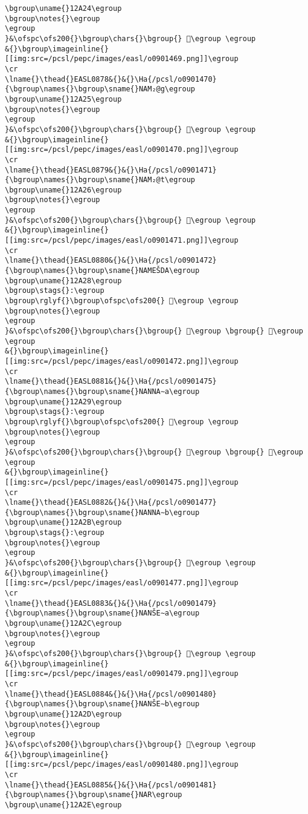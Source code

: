 \begin{verbatim}
\bgroup\uname{}12A24\egroup
\bgroup\notes{}\egroup
\egroup
}&\ofspc\ofs200{}\bgroup\chars{}\bgroup{} 𒨤\egroup \egroup
&{}\bgroup\imageinline{}[[img:src=/pcsl/pepc/images/easl/o0901469.png]]\egroup
\cr
\lname{}\thead{}EASL0878&{}&{}\Ha{/pcsl/o0901470}{\bgroup\names{}\bgroup\sname{}NAM₂@g\egroup
\bgroup\uname{}12A25\egroup
\bgroup\notes{}\egroup
\egroup
}&\ofspc\ofs200{}\bgroup\chars{}\bgroup{} 𒨥\egroup \egroup
&{}\bgroup\imageinline{}[[img:src=/pcsl/pepc/images/easl/o0901470.png]]\egroup
\cr
\lname{}\thead{}EASL0879&{}&{}\Ha{/pcsl/o0901471}{\bgroup\names{}\bgroup\sname{}NAM₂@t\egroup
\bgroup\uname{}12A26\egroup
\bgroup\notes{}\egroup
\egroup
}&\ofspc\ofs200{}\bgroup\chars{}\bgroup{} 𒨦\egroup \egroup
&{}\bgroup\imageinline{}[[img:src=/pcsl/pepc/images/easl/o0901471.png]]\egroup
\cr
\lname{}\thead{}EASL0880&{}&{}\Ha{/pcsl/o0901472}{\bgroup\names{}\bgroup\sname{}NAMEŠDA\egroup
\bgroup\uname{}12A28\egroup
\bgroup\stags{}:\egroup
\bgroup\rglyf{}\bgroup\ofspc\ofs200{} 𒨨\egroup \egroup
\bgroup\notes{}\egroup
\egroup
}&\ofspc\ofs200{}\bgroup\chars{}\bgroup{} 𒨧\egroup \bgroup{} 𒨨\egroup \egroup
&{}\bgroup\imageinline{}[[img:src=/pcsl/pepc/images/easl/o0901472.png]]\egroup
\cr
\lname{}\thead{}EASL0881&{}&{}\Ha{/pcsl/o0901475}{\bgroup\names{}\bgroup\sname{}NANNA∼a\egroup
\bgroup\uname{}12A29\egroup
\bgroup\stags{}:\egroup
\bgroup\rglyf{}\bgroup\ofspc\ofs200{} 𒨩\egroup \egroup
\bgroup\notes{}\egroup
\egroup
}&\ofspc\ofs200{}\bgroup\chars{}\bgroup{} 𒨩\egroup \bgroup{} 𒨪\egroup \egroup
&{}\bgroup\imageinline{}[[img:src=/pcsl/pepc/images/easl/o0901475.png]]\egroup
\cr
\lname{}\thead{}EASL0882&{}&{}\Ha{/pcsl/o0901477}{\bgroup\names{}\bgroup\sname{}NANNA∼b\egroup
\bgroup\uname{}12A2B\egroup
\bgroup\stags{}:\egroup
\bgroup\notes{}\egroup
\egroup
}&\ofspc\ofs200{}\bgroup\chars{}\bgroup{} 𒨫\egroup \egroup
&{}\bgroup\imageinline{}[[img:src=/pcsl/pepc/images/easl/o0901477.png]]\egroup
\cr
\lname{}\thead{}EASL0883&{}&{}\Ha{/pcsl/o0901479}{\bgroup\names{}\bgroup\sname{}NANŠE∼a\egroup
\bgroup\uname{}12A2C\egroup
\bgroup\notes{}\egroup
\egroup
}&\ofspc\ofs200{}\bgroup\chars{}\bgroup{} 𒨬\egroup \egroup
&{}\bgroup\imageinline{}[[img:src=/pcsl/pepc/images/easl/o0901479.png]]\egroup
\cr
\lname{}\thead{}EASL0884&{}&{}\Ha{/pcsl/o0901480}{\bgroup\names{}\bgroup\sname{}NANŠE∼b\egroup
\bgroup\uname{}12A2D\egroup
\bgroup\notes{}\egroup
\egroup
}&\ofspc\ofs200{}\bgroup\chars{}\bgroup{} 𒨭\egroup \egroup
&{}\bgroup\imageinline{}[[img:src=/pcsl/pepc/images/easl/o0901480.png]]\egroup
\cr
\lname{}\thead{}EASL0885&{}&{}\Ha{/pcsl/o0901481}{\bgroup\names{}\bgroup\sname{}NAR\egroup
\bgroup\uname{}12A2E\egroup

\end{verbatim}
